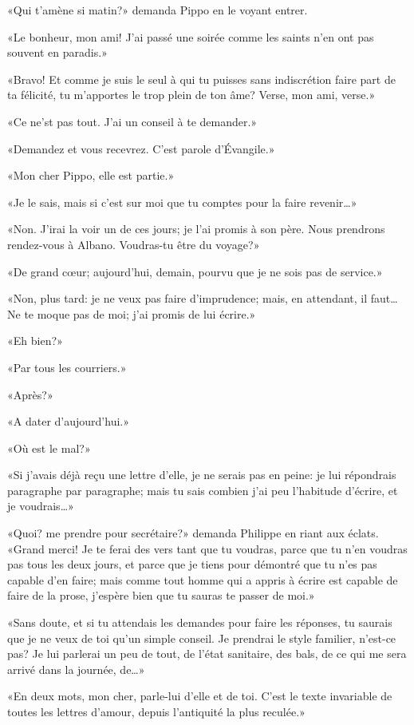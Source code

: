 «Qui t'amène si matin?» demanda Pippo en le voyant entrer.

«Le bonheur, mon ami! J'ai passé une soirée comme les saints n'en ont
pas souvent en paradis.»

«Bravo! Et comme je suis le seul à qui tu puisses sans indiscrétion
faire part de ta félicité, tu m'apportes le trop plein de ton âme?
Verse, mon ami, verse.»

«Ce ne'st pas tout. J'ai un conseil à te demander.»

«Demandez et vous recevrez. C'est parole d'Évangile.»

«Mon cher Pippo, elle est partie.»

«Je le sais, mais si c'est sur moi que tu comptes pour la faire
revenir\ldots»

«Non. J'irai la voir un de ces jours; je l'ai promis à son père. Nous
prendrons rendez-vous à Albano. Voudras-tu être du voyage?»

«De grand cœur; aujourd'hui, demain, pourvu que je ne sois pas de
service.»

«Non, plus tard: je ne veux pas faire d'imprudence; mais, en attendant,
il faut\ldots{} Ne te moque pas de moi; j'ai promis de lui écrire.»

«Eh bien?»

«Par tous les courriers.»

«Après?»

«A dater d'aujourd'hui.»

«Où est le mal?»

«Si j'avais déjà reçu une lettre d'elle, je ne serais pas en peine: je
lui répondrais paragraphe par paragraphe; mais tu sais combien j'ai peu
l'habitude d'écrire, et je voudrais\ldots»

«Quoi? me prendre pour secrétaire?» demanda Philippe en riant aux
éclats. «Grand merci! Je te ferai des vers tant que tu voudras, parce
que tu n'en voudras pas tous les deux jours, et parce que je tiens pour
démontré que tu n'es pas capable d'en faire; mais comme tout homme qui a
appris à écrire est capable de faire de la prose, j'espère bien que tu
sauras te passer de moi.»

«Sans doute, et si tu attendais les demandes pour faire les réponses, tu
saurais que je ne veux de toi qu'un simple conseil. Je prendrai le style
familier, n'est-ce pas? Je lui parlerai un peu de tout, de l'état
sanitaire, des bals, de ce qui me sera arrivé dans la journée, de\ldots»

«En deux mots, mon cher, parle-lui d'elle et de toi. C'est le texte
invariable de toutes les lettres d'amour, depuis l'antiquité la plus
reculée.»

